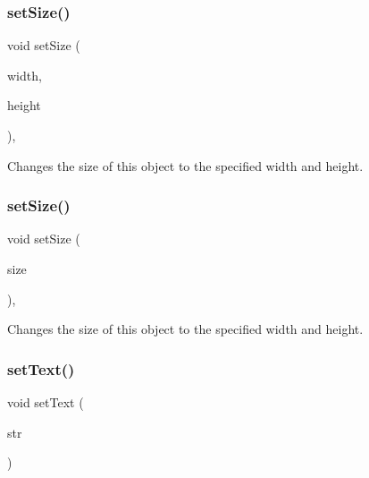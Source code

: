 \subsubsection{\texorpdfstring{set\+Size()}{setSize()}\hspace{0.1cm}{\footnotesize\ttfamily [1/2]}}
{\footnotesize\ttfamily void set\+Size (\begin{DoxyParamCaption}\item[{double}]{width,  }\item[{double}]{height }\end{DoxyParamCaption})\hspace{0.3cm}{\ttfamily [virtual]}, {\ttfamily [inherited]}}



Changes the size of this object to the specified width and height. 

\mbox{\label{classGObject_ae2b628228f192c2702c4ce941b2af68f}} 
\subsubsection{\texorpdfstring{set\+Size()}{setSize()}\hspace{0.1cm}{\footnotesize\ttfamily [2/2]}}
{\footnotesize\ttfamily void set\+Size (\begin{DoxyParamCaption}\item[{const \mbox{\hyperlink{classGDimension}{G\+Dimension}} \&}]{size }\end{DoxyParamCaption})\hspace{0.3cm}{\ttfamily [virtual]}, {\ttfamily [inherited]}}



Changes the size of this object to the specified width and height. 

\mbox{\label{classGText_ac98cbe102af8aaf8fd017228d645bfda}} 
\subsubsection{\texorpdfstring{set\+Text()}{setText()}}
{\footnotesize\ttfamily void set\+Text (\begin{DoxyParamCaption}\item[{const std\+::string \&}]{str }\end{DoxyParamCaption})\hspace{0.3cm}{\ttfamily [virtual]}}



